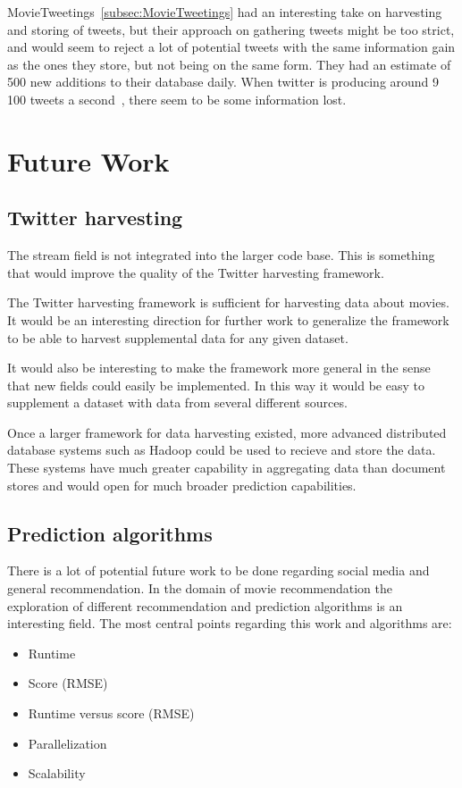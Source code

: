 MovieTweetings~\ref{subsec:MovieTweetings} had an interesting take on harvesting and storing of tweets, but their approach on gathering tweets might be too strict, and would seem to reject a lot of potential tweets with the same information gain as the ones they store, but not being on the same form. They had an estimate of 500 new additions to their database daily. When twitter is producing around 9 100 tweets a second~\cite{twitt-stats}, there seem to be some information lost.



\section{Future Work}
\subsection{Twitter harvesting}
The stream field is not integrated into the larger code base. This is something that would improve the quality of the Twitter harvesting framework.

The Twitter harvesting framework is sufficient for harvesting data about movies. It would be an interesting direction for further work to generalize the framework to be able to harvest supplemental data for any given dataset.

It would also be interesting to make the framework more general in the sense that new fields could easily be implemented. In this way it would be easy to supplement a dataset with data from several different sources.

Once a larger framework for data harvesting existed, more advanced distributed database systems such as Hadoop could be used to recieve and store the data. These systems have much greater capability in aggregating data than document stores and would open for much broader prediction capabilities.


\subsection{Prediction algorithms}
There is a lot of potential future work to be done regarding social media and general recommendation. In the domain of movie recommendation the exploration of different recommendation and prediction algorithms is an interesting field. The most central points regarding this work and algorithms are:

\begin{itemize}
    \item Runtime
    \item Score (RMSE)
    \item Runtime versus score (RMSE)
    \item Parallelization
    \item Scalability
\end{itemize}

